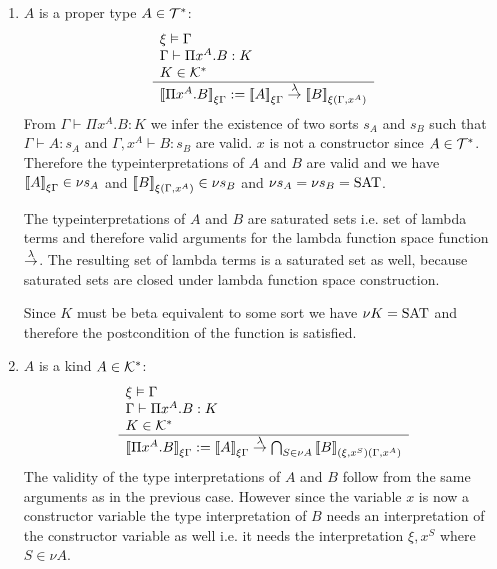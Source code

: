\begin{definition}
\begin{enumerate}
        \begin{enumerate}
        \item $A$ is a proper type $A \in {\cal T}^*$:
        $$
            \begin{array}{l} 
                \xi \vDash \Gamma
                \\
                \Gamma \vdash \Pi x^A.B : K
                \\
                K \in {\cal K}^*
             \\ \hline 
                {{[\![}\Pi x^A. B{]\!]}}_{\xi\Gamma}
                :=
                {{[\![} A{]\!]}}_{\xi\Gamma}
                \stackrel{\lambda}{\to}
                {{[\![} B{]\!]}}_{\xi(\Gamma,x^A)}
            \end{array}
        $$
        From $\Gamma \vdash \Pi x^A.B : K$ we infer the existence of two sorts
                $s_A$ and $s_B$ such that $\Gamma \vdash A: s_A$ and $\Gamma,x^A
                \vdash B: s_B$ are valid. $x$ is not a constructor since $A \in
                {\cal T}^*$. Therefore the typeinterpretations of $A$ and $B$ are
                valid and we have ${{[\![} A{]\!]}}_{\xi\Gamma} \in \nu s_A$ and
                ${{[\![} B{]\!]}}_{\xi(\Gamma,x^A)} \in \nu s_B$ and $\nu s_A = \nu
                s_B = \text{SAT}$.

        The typeinterpretations of $A$ and $B$ are saturated sets i.e. set of
                lambda terms and therefore valid arguments for the lambda
                function space function $\stackrel{\lambda}{\to}$. The resulting set of lambda
                terms is a saturated set as well, because saturated sets are
                closed under lambda function space construction.

        Since $K$ must be beta equivalent to some sort we have $\nu K =
                \text{SAT}$ and therefore the postcondition of the function is
                satisfied.

        \item $A$ is a kind $A \in {\cal K}^*$:
            $$
            \begin{array}{l} 
                \xi \vDash \Gamma
                \\
                \Gamma \vdash \Pi x^A.B : K
                \\
                K \in {\cal K}^*
             \\ \hline 
                {{[\![}\Pi x^A. B{]\!]}}_{\xi\Gamma}
                :=
                {{[\![} A{]\!]}}_{\xi\Gamma}
                \stackrel{\lambda}{\to}
                \bigcap_{S \in \nu A}
                {{[\![} B{]\!]}}_{(\xi,x^S)(\Gamma,x^A)}
            \end{array}
            $$
            The validity of the type interpretations of $A$ and $B$ follow from the
            same arguments as in the previous case. However since the
            variable $x$ is now a constructor variable the type
            interpretation of $B$ needs an interpretation of the constructor
            variable as well i.e. it needs the interpretation $\xi, x^S$
            where $S \in \nu A$.


\end{enumerate}
\end{enumerate}
\end{definition}
